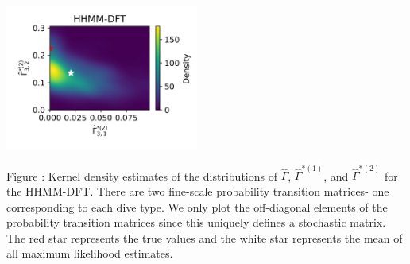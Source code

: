 \documentclass{article}
\begin{document}
\begin{center}
        \includegraphics[width=2.5in]{../Plots/hhmm_FV_uncorr_Gamma_density_1_row_2.png}
        \end{center}
        
        \noindent Figure : Kernel density estimates of the distributions of $\hat \Gamma$, $\hat \Gamma^{*(1)}$, and $\hat \Gamma^{*(2)}$ for the HHMM-DFT. There are two fine-scale probability transition matrices- one corresponding to each dive type. We only plot the off-diagonal elements of the probability transition matrices since this uniquely defines a stochastic matrix. The red star represents the true values and the white star represents the mean of all maximum likelihood estimates.
        \addtocounter{fignum}{1}
        
        \newpage
\end{document}
